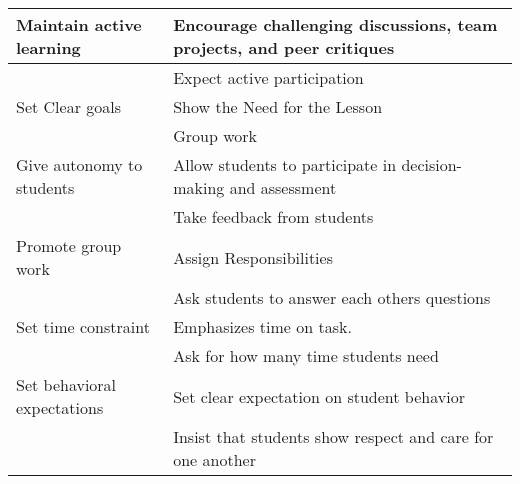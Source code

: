 {\begin{table}[H]
\begin{tabular}{p{125pt}p{125pt}}
                                                           \hline
Maintain active learning                                   & Encourage challenging discussions, team projects, and peer critiques  \\
\hline
                                                           & Expect active participation ~                                         \\
Set Clear goals~                                           & Show the Need for the Lesson~                                         \\
                                                           & Group work                                                            \\
                                                           \hline
Give autonomy to students                                  & Allow students to participate in decision-making and assessment ~     \\
\hline
                                                           & Take feedback from students~                                          \\
Promote group work                                         & Assign Responsibilities~                                              \\
                                                           & Ask students to answer each others questions ~                        \\
                                                           \hline
Set time constraint                                        & Emphasizes time on task.~                                             \\
                                                           & Ask for how many time students need                                   \\
                                                           \hline
Set behavioral expectations                                & Set clear expectation on student behavior                             \\
                                                           & Insist that students show respect and care for one another~~          \\
                                                           \bottomrule
\end{tabular}
\end{table}}{\begin{table}[H]

\end{table}}
